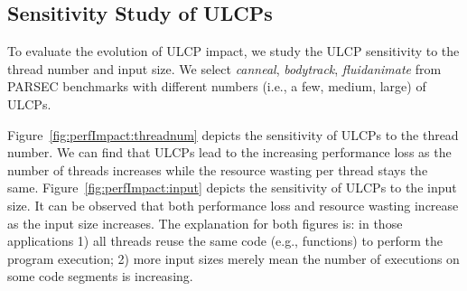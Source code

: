 \subsection{Sensitivity Study of ULCPs}
\label{lable:sensitivity}
To evaluate the evolution of ULCP impact, we study the ULCP sensitivity to the thread number and input size. We select \emph{canneal}, \emph{bodytrack}, \emph{fluidanimate} from PARSEC benchmarks with different numbers (i.e., a few, medium, large) of ULCPs.

Figure~\ref{fig:perfImpact:threadnum} depicts the sensitivity of ULCPs to the thread number. We can find that ULCPs lead to the increasing performance loss as the number of threads increases while the resource wasting per thread stays the same.
Figure~\ref{fig:perfImpact:input} depicts the sensitivity of ULCPs to the input size. It can be observed that both performance loss and resource wasting increase as the input size increases.
The explanation for both figures is: in those applications 1) all threads reuse the same code (e.g., functions) to perform the program execution; 2) more input sizes merely mean the number of executions on some code segments is increasing.

